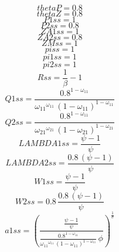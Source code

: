 \begin{dmath*}
thetaP = 0.8
\end{dmath*}
\begin{dmath*}
thetaZ = 0.8
\end{dmath*}
\begin{dmath*}
P1ss = 1
\end{dmath*}
\begin{dmath*}
P2ss = 0.8
\end{dmath*}
\begin{dmath*}
ZA1ss = 1
\end{dmath*}
\begin{dmath*}
ZA2ss = 0.8
\end{dmath*}
\begin{dmath*}
ZMss = 1
\end{dmath*}
\begin{dmath*}
piss = 1
\end{dmath*}
\begin{dmath*}
pi1ss = 1
\end{dmath*}
\begin{dmath*}
pi2ss = 1
\end{dmath*}
\begin{dmath*}
Rss = \frac{1}{{{\beta}}}-1
\end{dmath*}
\begin{dmath*}
Q1ss = \frac{0.8^{1-{{\omega_{11}}}}}{{{\omega_{11}}}^{{{\omega_{11}}}}\, \left(1-{{\omega_{11}}}\right)^{1-{{\omega_{11}}}}}
\end{dmath*}
\begin{dmath*}
Q2ss = \frac{0.8^{1-{{\omega_{11}}}}}{{{\omega_{21}}}^{{{\omega_{21}}}}\, \left(1-{{\omega_{21}}}\right)^{1-{{\omega_{21}}}}}
\end{dmath*}
\begin{dmath*}
LAMBDA1ss = \frac{{{\psi}}-1}{{{\psi}}}
\end{dmath*}
\begin{dmath*}
LAMBDA2ss = \frac{0.8\, \left({{\psi}}-1\right)}{{{\psi}}}
\end{dmath*}
\begin{dmath*}
W1ss = \frac{{{\psi}}-1}{{{\psi}}}
\end{dmath*}
\begin{dmath*}
W2ss = 0.8\, \frac{0.8\, \left({{\psi}}-1\right)}{{{\psi}}}
\end{dmath*}
\begin{dmath*}
a1ss = \left(\frac{\frac{{{\psi}}-1}{{{\psi}}}}{\frac{0.8^{1-{{\omega_{11}}}}}{{{\omega_{11}}}^{{{\omega_{11}}}}\, \left(1-{{\omega_{11}}}\right)^{1-{{\omega_{11}}}}}\, {{\phi}}}\right)^{\frac{1}{{{\sigma}}}}
\end{dmath*}
